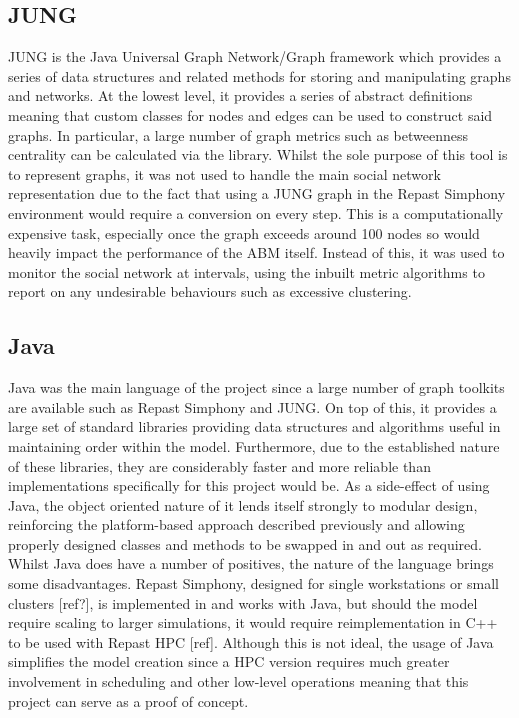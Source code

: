 \documentclass[]{report}
\begin{document}
\subsection{JUNG}
JUNG is the Java Universal Graph Network/Graph framework which provides a series of data structures and related methods for storing and manipulating graphs and networks. At the lowest level, it provides a series of abstract definitions meaning that custom classes for nodes and edges can be used to construct said graphs. In particular, a large number of graph metrics such as betweenness centrality can be calculated via the library.
Whilst the sole purpose of this tool is to represent graphs, it was not used to handle the main social network representation due to the fact that using a JUNG graph in the Repast Simphony environment would require a conversion on every step. This is a computationally expensive task, especially once the graph exceeds around 100 nodes so would heavily impact the performance of the ABM itself. Instead of this, it was used to monitor the social network at intervals, using the inbuilt metric algorithms to report on any undesirable behaviours such as excessive clustering. 
\subsection{Java}
Java was the main language of the project since a large number of graph toolkits are available such as Repast Simphony and JUNG. On top of this, it provides a large set of standard libraries providing data structures and algorithms useful in maintaining order within the model. Furthermore, due to the established nature of these libraries, they are considerably faster and more reliable than implementations specifically for this project would be. As a side-effect of using Java, the object oriented nature of it lends itself strongly to modular design, reinforcing the platform-based approach described previously and allowing properly designed classes and methods to be swapped in and out as required.
Whilst Java does have a number of positives, the nature of the language brings some disadvantages. Repast Simphony, designed for single workstations or small clusters [ref?], is implemented in and works with Java, but should the model require scaling to larger simulations, it would require reimplementation in C++ to be used with Repast HPC [ref]. Although this is not ideal, the usage of Java simplifies the model creation since a HPC version requires much greater involvement in scheduling and other low-level operations meaning that this project can serve as a proof of concept.
\end{document}
